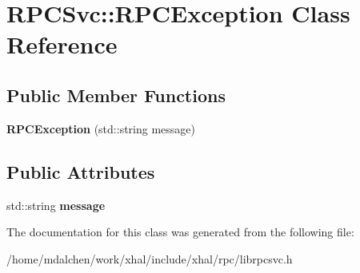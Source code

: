 \hypertarget{classRPCSvc_1_1RPCException}{
\section{RPCSvc::RPCException Class Reference}
\label{classRPCSvc_1_1RPCException}
}
\subsection*{Public Member Functions}
\begin{DoxyCompactItemize}
\item 
\hypertarget{classRPCSvc_1_1RPCException_a08ff0c57d7fb8f4fca4835b64f690d6e}{
{\bfseries RPCException} (std::string message)}
\label{classRPCSvc_1_1RPCException_a08ff0c57d7fb8f4fca4835b64f690d6e}

\end{DoxyCompactItemize}
\subsection*{Public Attributes}
\begin{DoxyCompactItemize}
\item 
\hypertarget{classRPCSvc_1_1RPCException_aef8e2b00221858c415e71e8e19969c05}{
std::string {\bfseries message}}
\label{classRPCSvc_1_1RPCException_aef8e2b00221858c415e71e8e19969c05}

\end{DoxyCompactItemize}


The documentation for this class was generated from the following file:\begin{DoxyCompactItemize}
\item 
/home/mdalchen/work/xhal/include/xhal/rpc/librpcsvc.h\end{DoxyCompactItemize}
